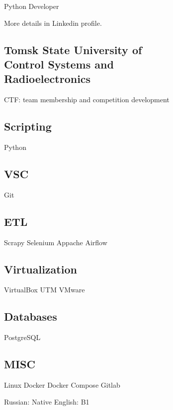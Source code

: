 \documentclass[a4paper]{MagicalCV}
\begin{document}
\lastupdated


\begin{minipage}[t]{0.33\textwidth} 


Python Developer

More details in Linkedin profile.
\sectionsep




\sectionsep


\subsection{Tomsk State University of \\ Control Systems and \\ Radioelectronics}
\vspace{\topsep} %
CTF: team membership and competition development
\sectionsep


\subsection{Scripting}
Python
\subsection{VSC}
Git
\subsection{ETL}
Scrapy \textbullet{} Selenium \textbullet{} Appache Airflow
\subsection{Virtualization}
VirtualBox \textbullet{} UTM \textbullet{} VMware
\subsection{Databases}
PostgreSQL
\subsection{MISC}
Linux \textbullet{} Docker \textbullet{} Docker Compose
Gitlab



Russian: Native \textbullet{} English: B1
\sectionsep

\end{minipage} 
\end{document}
